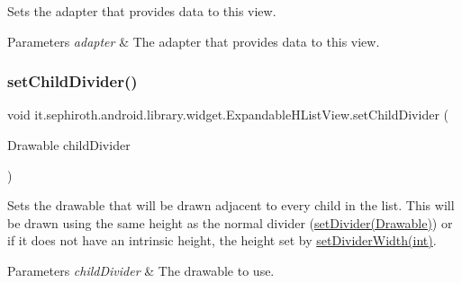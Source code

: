 Sets the adapter that provides data to this view.


\begin{DoxyParams}{Parameters}
{\em adapter} & The adapter that provides data to this view. \\
\hline
\end{DoxyParams}
\mbox{\label{classit_1_1sephiroth_1_1android_1_1library_1_1widget_1_1_expandable_h_list_view_a00b52ec2739b10d85b3fdcb397d4bd23}} 
\subsubsection{\texorpdfstring{set\+Child\+Divider()}{setChildDivider()}}
{\footnotesize\ttfamily void it.\+sephiroth.\+android.\+library.\+widget.\+Expandable\+H\+List\+View.\+set\+Child\+Divider (\begin{DoxyParamCaption}\item[{Drawable}]{child\+Divider }\end{DoxyParamCaption})}

Sets the drawable that will be drawn adjacent to every child in the list. This will be drawn using the same height as the normal divider (\hyperlink{classit_1_1sephiroth_1_1android_1_1library_1_1widget_1_1_h_list_view_a2a289047ef4485a4bed758c2bc3d0859}{set\+Divider(\+Drawable)}) or if it does not have an intrinsic height, the height set by \hyperlink{classit_1_1sephiroth_1_1android_1_1library_1_1widget_1_1_h_list_view_af8b514a0bddf2dcec7696aadc301de99}{set\+Divider\+Width(int)}.


\begin{DoxyParams}{Parameters}
{\em child\+Divider} & The drawable to use. \\
\hline
\end{DoxyParams}
\mbox{\label{classit_1_1sephiroth_1_1android_1_1library_1_1widget_1_1_expandable_h_list_view_a60116cb7b4a6702ef832d3b134a78778}} 
